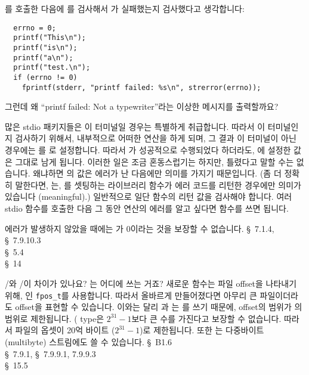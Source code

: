 \begin{faq}
	를 호출한 다음에 를 검사해서 가
	실패했는지 검사했다고 생각합니다:

\begin{verbatim}
  errno = 0;
  printf("This\n");
  printf("is\n");
  printf("a\n");
  printf("test.\n");
  if (errno != 0)
    fprintf(stderr, "printf failed: %s\n", strerror(errno));
\end{verbatim}

	그런데 왜 ``printf failed: Not a typewriter''라는 이상한 메시지를
	출력할까요?

\A
	많은 stdio 패키지들은 이 터미널일 경우는 특별하게
	취급합니다.
	따라서 이 터미널인지 검사하기 위해서, 내부적으로 어떠한
	연산을 하게 되며, 그 결과 이 터미널이 아닌 경우에는
	를 로 설정합니다.  따라서 가 성공적으로
	수행되었다 하더라도, 에 설정한 값은 그대로 남게 됩니다.
	이러한 일은 조금 혼동스럽기는 하지만, 틀렸다고 말할 수는 없습니다.
	왜냐하면 의 값은 에러가 난 다음에만 의미를 가지기 때문입니다.
	(좀 더 정확히 말한다면, 는, 를 셋팅하는
	라이브러리 함수가 에러 코드를 리턴한 경우에만 의미가 있습니다
	(meaningful).)
	일반적으로 일단 함수의 리턴 값을 검사해야 합니다. 여러 stdio 함수를
	호출한 다음 그 동안 연산의 에러를 알고 싶다면  함수를
	쓰면 됩니다.  

\T
	에러가 발생하지 않았을 때에는
	가 0이라는 것을 보장할 수 없습니다.
\R
	\cite{c89} \S\ 7.1.4, \S\ 7.9.10.3 \\
	\cite{ctp} \S\ 5.4  \\
	\cite{pcs} \S\ 14 
\end{faq}

\begin{faq}
	/와 /이 차이가 있나요?
        는 어디에 쓰는 거죠?
\A
	새로운  함수는
	파일 offset을 나타내기 위해, 인 \verb+fpos_t+를 
	사용합니다.
	따라서 올바르게 만들어졌다면 아무리 큰 파일이더라도 offset을
	표현할 수 있습니다.
	이와는 달리 과 는 를 쓰기 때문에,
	offset의 범위가 의 범위로 제한됩니다.
	( type은 $2^{31}-1$보다 큰 수를 가진다고 보장할 수
	없습니다.  따라서 파일의 옵셋이 20억 바이트
	($2^{31}-1$)로 제한됩니다.
%
	또한 는
	다중바이트(multibyte) 스트림에도 쓸 수 있습니다.  
\R
	\cite{kr2} \S\ B1.6  \\
	\cite{c89} \S\ 7.9.1, \S\ 7.9.9.1, 7.9.9.3 \\
	\cite{hs} \S\ 15.5 
\end{faq}

